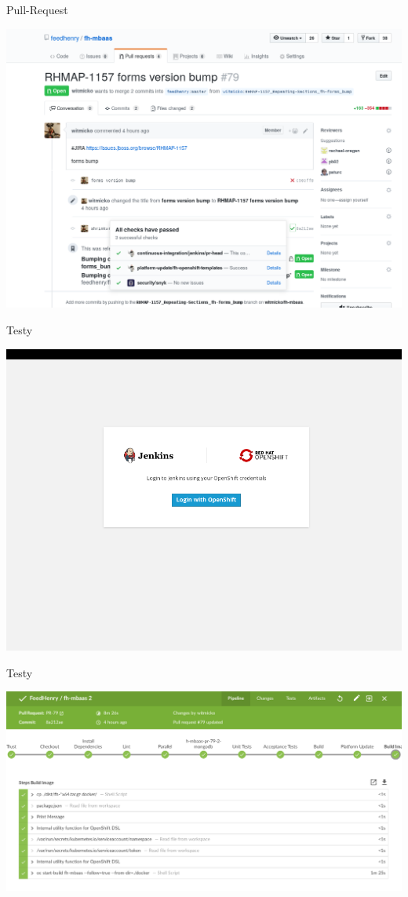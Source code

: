 \documentclass[bigger]{beamer}
\begin{document}
\begin{frame}[label={sec:org46724a6}]{Pull-Request}
\begin{center}
\includegraphics[width=.9\linewidth]{./010fhmbaas.png}
\end{center}
\end{frame}
\begin{frame}[label={sec:org55c3e23}]{Testy}
\begin{center}
\includegraphics[width=.9\linewidth]{./011fhmbaas.png}
\end{center}
\end{frame}
\begin{frame}[label={sec:org4445d81}]{Testy}
\begin{center}
\includegraphics[width=.9\linewidth]{./012fhmbaas.png}
\end{center}
\end{frame}
\end{document}
